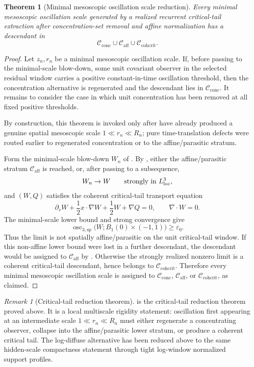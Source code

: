 \documentclass[11pt]{amsart}
\numberwithin{equation}{section}
\theoremstyle{plain}
\newtheorem{theorem}{Theorem}[section]
\theoremstyle{definition}
\theoremstyle{remark}
\newtheorem{remark}[remark]{Remark}
\newcommand{\loc}{\mathrm{loc}}
\newcommand{\Cactive}{\mathcal C_{\mathrm{conc}}}
\newcommand{\Caff}{\mathcal C_{\mathrm{aff}}}
\newcommand{\Ccohcrit}{\mathcal C_{\mathrm{cohcrit}}}
\newcommand{\oscsp}{\operatorname{osc}_{3,\mathrm{sp}}}
\begin{document}
\begin{theorem}[Minimal mesoscopic oscillation scale reduction]
\label{thm:first-bad-mesoscopic-reduction}
Every minimal mesoscopic oscillation scale generated by a realized recurrent
critical-tail extraction after concentration-set removal and affine normalization
has a descendant in
\[
   \Cactive\cup\Caff\cup\Ccohcrit .
\]
\end{theorem}

\begin{proof}
Let \(z_n,r_n\) be a minimal mesoscopic oscillation scale.  If, before passing to the
minimal-scale blow-down, some unit covariant observer in the selected residual
window carries a positive constant-in-time oscillation threshold, then the
concentration alternative is regenerated and the descendant lies in \(\Cactive\).  It remains to
consider the case in which unit concentration has been removed at all fixed positive
thresholds.

By construction, this theorem is invoked only after
have already produced a genuine spatial mesoscopic scale
\(1\ll r_n\ll R_n\); pure time-translation defects were routed earlier to
regenerated concentration or to the affine/parasitic stratum.

Form the minimal-scale blow-down \(W_n\) of
.  By
, either the affine/parasitic stratum
\(\Caff\) is reached, or, after passing to a subsequence,
\[
   W_n\to W
   \qquad\hbox{strongly in }L^3_{\loc},
\]
and \((W,Q)\) satisfies the coherent critical-tail transport equation
\[
   \partial_sW+\frac12x\cdot\nabla W+\frac12W+\nabla Q=0,
   \qquad \nabla\cdot W=0 .
\]
The minimal-scale lower bound and strong convergence give
\[
   \oscsp\bigl(W;B_1(0)\times(-1,1)\bigr)
   \ge \varepsilon_0 .
\]
Thus the limit is not spatially affine/parasitic on the unit critical-tail
window.  If this non-affine lower bound were lost in a further descendant, the
descendant would be assigned to \(\Caff\) by
.  Otherwise the strongly realized
nonzero limit is a coherent critical-tail descendant, hence belongs to
\(\Ccohcrit\).  Therefore every minimal mesoscopic oscillation scale is assigned to
\(\Cactive\), \(\Caff\), or \(\Ccohcrit\), as claimed.
\end{proof}

\begin{remark}[Critical-tail reduction theorem]
\label{rem:remaining-hidden-scale-input}
 is the critical-tail reduction
theorem proved above.  It is a local multiscale rigidity statement: oscillation
first appearing at an intermediate scale
\(1\ll r_n\ll R_n\) must either regenerate a concentrating observer, collapse into
the affine/parasitic lower stratum, or produce a coherent critical tail.  The
log-diffuse alternative has been reduced above to the same hidden-scale compactness
statement through tight log-window normalized support profiles.
\end{remark}
\end{document}
